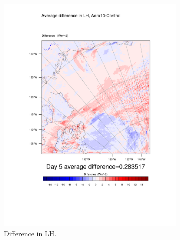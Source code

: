 \begin{figure}
\centering
	\begin{subfigure}{0.48\textwidth}
		\includegraphics[width=\textwidth]{results/aero10/diff_Aero10_LH_Day5.pdf}
		\caption{Difference in LH.}
		\label{subfig:lh_r3Day5}
	\end{subfigure}
	\quad
	\begin{subfigure}{0.48\textwidth}

\end{subfigure}
\end{figure}
